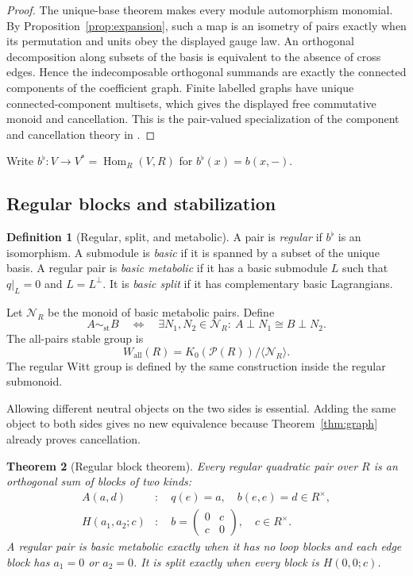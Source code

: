 \documentclass[11pt]{article}
\newtheorem{theorem}{Theorem}[section]
\theoremstyle{definition}
\newtheorem{definition}[theorem]{Definition}
\theoremstyle{remark}
\newcommand{\Pair}{\mathcal P}
\begin{document}
\begin{proof}
The unique-base theorem makes every module automorphism monomial.  By
Proposition~\ref{prop:expansion}, such a map is an isometry of pairs exactly
when its permutation and units obey the displayed gauge law.  An orthogonal
decomposition along subsets of the basis is equivalent to the absence of
cross edges.  Hence the indecomposable orthogonal summands are exactly the
connected components of the coefficient graph.  Finite labelled graphs have
unique connected-component multisets, which gives the displayed free
commutative monoid and cancellation.  This is the pair-valued specialization
of the component and cancellation theory in
\cite[Theorems~2.6 and~4.9]{ikr2016uniquebase}.
\end{proof}

Write \(b^\flat:V\to V^*=\operatorname{Hom}_R(V,R)\) for
\(b^\flat(x)=b(x,-)\).

\subsection{Regular blocks and stabilization}

\begin{definition}[Regular, split, and metabolic]\label{def:stable}
A pair is \emph{regular} if \(b^\flat\) is an isomorphism.  A submodule is
\emph{basic} if it is spanned by a subset of the unique basis.  A regular pair
is \emph{basic metabolic} if it has a basic submodule \(L\) such that
\(q|_L=0\) and \(L=L^\perp\).  It is \emph{basic split} if it has complementary
basic Lagrangians.

Let \(\mathcal N_R\) be the monoid of basic metabolic pairs.  Define
\[
 A\sim_{\mathrm{st}}B
 \quad\Longleftrightarrow\quad
 \exists N_1,N_2\in\mathcal N_R:\
 A\perp N_1\cong B\perp N_2.
\]
The all-pairs stable group is
\[
 W_{\mathrm{all}}(R)=K_0(\Pair(R))/\langle\mathcal N_R\rangle.
\]
The regular Witt group is defined by the same construction inside the regular
submonoid.
\end{definition}

Allowing different neutral objects on the two sides is essential.  Adding the
same object to both sides gives no new equivalence because Theorem~\ref{thm:graph}
already proves cancellation.

\begin{theorem}[Regular block theorem]\label{thm:blocks}
Every regular quadratic pair over \(R\) is an orthogonal sum of blocks of two
kinds:
\begin{align*}
 A(a,d)&:\quad q(e)=a,\quad b(e,e)=d\in R^\times,\\
 H(a_1,a_2;c)&:\quad
 b=\begin{pmatrix}0&c\\c&0\end{pmatrix},\quad c\in R^\times.
\end{align*}
A regular pair is basic metabolic exactly when it has no loop blocks and each
edge block has \(a_1=0\) or \(a_2=0\).  It is split exactly when every block is
\(H(0,0;c)\).
\end{theorem}
\end{document}
